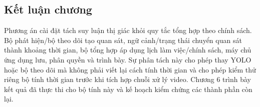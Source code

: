 \subsection{Kết luận chương}
Phương án cài đặt tách suy luận thị giác khỏi quy tắc tổng hợp theo chính sách. Bộ phát hiện/bộ theo dõi tạo quan sát, ngữ cảnh/trạng thái chuyển quan sát thành khoảng thời gian, bộ tổng hợp áp dụng lịch làm việc/chính sách, máy chủ ứng dụng lưu, phân quyền và trình bày. Sự phân tách này cho phép thay YOLO hoặc bộ theo dõi mà không phải viết lại cách tính thời gian và cho phép kiểm thử riêng bộ tính thời gian trước khi tích hợp chuỗi xử lý video. Chương 6 trình bày kết quả đã thực thi cho bộ tính này và kế hoạch kiểm chứng các thành phần còn lại.
